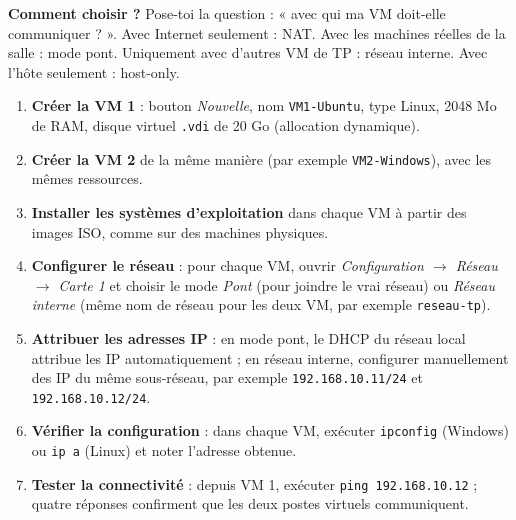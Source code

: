 \documentclass[11pt]{article}
\begin{document}
\textbf{Comment choisir ?} Pose-toi la question : « avec qui ma VM doit-elle communiquer ? ». Avec Internet seulement : NAT. Avec les machines réelles de la salle : mode pont. Uniquement avec d'autres VM de TP : réseau interne. Avec l'hôte seulement : host-only.

\begin{methode}
\begin{enumerate}
\item \textbf{Créer la VM 1} : bouton \emph{Nouvelle}, nom \texttt{VM1-Ubuntu}, type Linux, 2048 Mo de RAM, disque virtuel \texttt{.vdi} de 20 Go (allocation dynamique).
\item \textbf{Créer la VM 2} de la même manière (par exemple \texttt{VM2-Windows}), avec les mêmes ressources.
\item \textbf{Installer les systèmes d'exploitation} dans chaque VM à partir des images ISO, comme sur des machines physiques.
\item \textbf{Configurer le réseau} : pour chaque VM, ouvrir \emph{Configuration $\rightarrow$ Réseau $\rightarrow$ Carte 1} et choisir le mode \emph{Pont} (pour joindre le vrai réseau) ou \emph{Réseau interne} (même nom de réseau pour les deux VM, par exemple \texttt{reseau-tp}).
\item \textbf{Attribuer les adresses IP} : en mode pont, le DHCP du réseau local attribue les IP automatiquement ; en réseau interne, configurer manuellement des IP du même sous-réseau, par exemple \texttt{192.168.10.11/24} et \texttt{192.168.10.12/24}.
\item \textbf{Vérifier la configuration} : dans chaque VM, exécuter \texttt{ipconfig} (Windows) ou \texttt{ip a} (Linux) et noter l'adresse obtenue.
\item \textbf{Tester la connectivité} : depuis VM 1, exécuter \texttt{ping 192.168.10.12} ; quatre réponses confirment que les deux postes virtuels communiquent.
\end{enumerate}
\end{methode}
\end{document}
